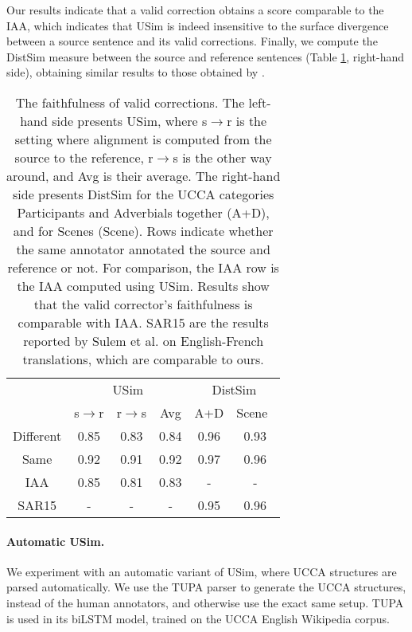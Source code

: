 \documentclass[a4paper, 11pt]{article}
\begin{document}
Our results indicate that a valid correction obtains a score comparable
to the IAA, which indicates that {\sc USim} is indeed
insensitive to the surface divergence between a source sentence and its valid corrections.
Finally, we compute the {\sc DistSim} measure
between the source and reference sentences (Table \ref{tab:Distances}, right-hand side),
obtaining similar results to those obtained by .

\begin{table}
	\vspace{-0.5cm}
  \small
  \centering
  \singlespacing
  \begin{tabular}{c|c|c|c||c|c|}
  	\cline{2-6} 
  	& \multicolumn{3}{c||}{\sc USim} & \multicolumn{2}{c|}{\sc DistSim}\\ \cline{2-6}
  	& s$\rightarrow$r & r$\rightarrow$s & Avg & A+D & Scene\
    \\
    \hline
    Different & 0.85 & 0.83 & 0.84 & 0.96 & 0.93
    \\
    Same & 0.92 & 0.91 & 0.92 & 0.97 & 0.96
    \\
    \hline
    \hline
    IAA & 0.85 & 0.81 & 0.83 & - & -
    \\
    \hline
    SAR15 & - & - & - & 0.95 & 0.96 \\
    \hline
  \end{tabular}
  \caption{\label{tab:Distances}
    The faithfulness of valid corrections.
    The left-hand side presents {\sc USim},
    where s$\rightarrow$r is the setting where alignment is computed from the source to the reference,
    r$\rightarrow$s is the other way around, and Avg is their average.
    The right-hand side presents {\sc DistSim} for the UCCA categories Participants and Adverbials
    together (A+D), and for Scenes (Scene).
    Rows indicate whether the same annotator annotated the source and reference or not.
    For comparison, the IAA row is the IAA computed using {\sc USim}.
    Results show that the valid corrector's faithfulness is comparable with IAA.
    SAR15 are the results reported by Sulem et al. on English-French
    translations, which are comparable to ours.}
\vspace{-0.6cm}
\end{table}


\paragraph{Automatic {\sc USim}.}

We experiment with an automatic variant of USim, where UCCA
structures are parsed automatically.
We use the TUPA parser \cite{hershcovich2017transition} to generate the UCCA structures,
instead of the human annotators, and otherwise use the exact same setup. 
TUPA is used in its biLSTM model, trained on the UCCA English Wikipedia corpus.
\end{document}
